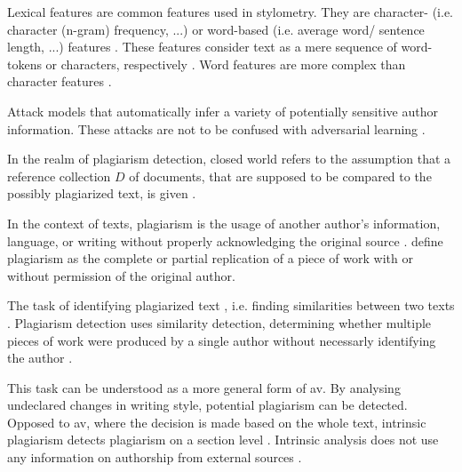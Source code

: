 \begin{definition}
    Lexical features are common features used in stylometry.
    They are character- (i.e. character (n-gram) frequency, ...) 
    or word-based (i.e. average word/ sentence length, ...) features \cite{stein_intrinsic_2011}. 
    These features consider text as a mere sequence of word-tokens or characters, respectively \cite{stamatatos_survey_2009}.
    Word features are more complex than character features \cite{stamatatos_survey_2009}.
\end{definition}

\begin{definition}
    Attack models that automatically infer a variety of potentially sensitive author information.
    These attacks are not to be confused with adversarial learning \cite{emmery_adversarial_2021}.
\end{definition}

\begin{definition}
    In the realm of plagiarism detection, closed world refers to the assumption that a reference collection $D$ of documents, that are supposed to be compared to the possibly plagiarized text, is given \cite{stein_intrinsic_2011}.
\end{definition}

\begin{definition}
    [Plagiarism]
    In the context of texts, plagiarism is the usage of another author's information, language, 
    or writing without properly acknowledging the original source \cite{stein_intrinsic_2011}.
    \citet{elmanarelbouanani_authorship_2014} define plagiarism as the complete or partial replication 
    of a piece of work with or without permission of the original author.
\end{definition}

\begin{definition}
    The task of identifying plagiarized text \cite{stein_intrinsic_2011}, i.e. finding similarities between two texts \cite{stamatatos_survey_2009}.
    Plagiarism detection uses similarity detection, determining whether multiple pieces of work were produced by a single author 
    without necessarly identifying the author \cite{elmanarelbouanani_authorship_2014}.
\end{definition}

\begin{definition}
    This task can be understood as a more general form of \ac{av}.
    By analysing undeclared changes in writing style, potential plagiarism can be detected.
    Opposed to \ac{av}, where the decision is made based on the whole text, 
    intrinsic plagiarism detects plagiarism on a section level \cite{stein_intrinsic_2011}.
    Intrinsic analysis does not use any information on authorship from external sources \cite{zangerle_overview_2024}.
\end{definition}


